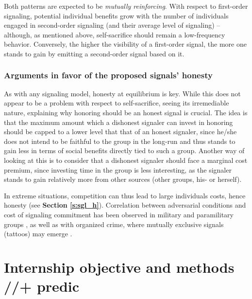 \documentclass[a4paper,12pt]{report}
\begin{document}
Both patterns are expected to be \emph{mutually reinforcing}. 
With respect to first-order signaling, potential individual 
benefits grow with the number of individuals engaged in second-order 
signaling (and their average level of signaling) – although, as mentioned above,
 self-sacrifice should remain a low-frequency behavior. Conversely, the higher 
 the visibility of a first-order signal, the more one stands to gain by emitting
  a second-order signal based on it.

\subsection{Arguments in favor of the proposed signals’ honesty}
\label{s:honesty}
As with any signaling model, honesty at equilibrium is key.
While this does not appear to be a problem with respect to self-sacrifice,
seeing its irremediable nature, explaining why honoring should be an honest
signal is crucial. The idea is that the maximum amount which a dishonest
signaler can invest in honoring should be capped to a lower level that that
of an honest signaler, since he/she does not intend to be faithful to the
group in the long-run and thus stands to gain less in terms of social benefits
directly tied to such a group. Another way of looking at this is to consider
that a dishonest signaler should face a marginal cost premium, since investing
time in the group is less interesting, as the signaler stands to gain relatively
more from other sources (other groups, his- or herself).

In extreme situations, competition can thus lead to large individuals costs,
hence honesty (see \textbf{Section \ref{s:sgl_h}}). Correlation between adversarial conditions and
cost of signaling commitment has been observed in military and paramilitary groups
\cite{atran_talking_2011}, as well as with organized crime, where mutually exclusive signals
(tattoos) may emerge \cite{slade_no_2012}. 









\chapter{Internship objective and methods //+ predic}
\end{document}
